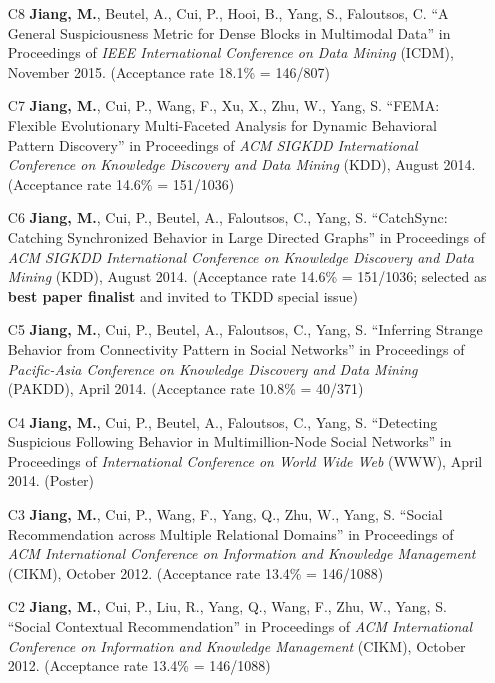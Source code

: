 \documentclass[10pt]{article}
\newenvironment{myindentpar}[1]%
{\begin{list}{}%
         {\setlength{\leftmargin}{#1}}%
         \item[]%
}
{\end{list}}
\newcounter{list}
\begin{document}
\begin{myindentpar}{0.00cm}
\begin{enumerate}[leftmargin=.5cm]
\item[C8] \textbf{Jiang, M.}, Beutel, A., Cui, P., Hooi, B., Yang, S., Faloutsos, C. ``A General Suspiciousness Metric for Dense Blocks in Multimodal Data'' in Proceedings of \textit{IEEE International Conference on Data Mining} (ICDM), November 2015. (Acceptance rate 18.1\% = 146/807)

\item[C7] \textbf{Jiang, M.}, Cui, P., Wang, F., Xu, X., Zhu, W., Yang, S. ``FEMA: Flexible Evolutionary Multi-Faceted Analysis for Dynamic Behavioral Pattern Discovery'' in Proceedings of \textit{ACM SIGKDD International Conference on Knowledge Discovery and Data Mining} (KDD), August 2014. (Acceptance rate 14.6\% = 151/1036)

\item[C6] \textbf{Jiang, M.}, Cui, P., Beutel, A., Faloutsos, C., Yang, S. ``CatchSync: Catching Synchronized Behavior in Large Directed Graphs'' in Proceedings of \textit{ACM SIGKDD International Conference on Knowledge Discovery and Data Mining} (KDD), August 2014. (Acceptance rate 14.6\% = 151/1036; selected as \textbf{best paper finalist} and invited to TKDD special issue)
	
\item[C5] \textbf{Jiang, M.}, Cui, P., Beutel, A., Faloutsos, C., Yang, S. ``Inferring Strange Behavior from Connectivity Pattern in Social Networks'' in Proceedings of \textit{Pacific-Asia Conference on Knowledge Discovery and Data Mining} (PAKDD), April 2014. (Acceptance rate 10.8\% = 40/371)

\item[C4] \textbf{Jiang, M.}, Cui, P., Beutel, A., Faloutsos, C., Yang, S. ``Detecting Suspicious Following Behavior in Multimillion-Node Social Networks'' in Proceedings of \textit{International Conference on World Wide Web} (WWW), April 2014. (Poster)

\item[C3] \textbf{Jiang, M.}, Cui, P., Wang, F., Yang, Q., Zhu, W., Yang, S. ``Social Recommendation across Multiple Relational Domains'' in Proceedings of \textit{ACM International Conference on Information and Knowledge Management} (CIKM), October 2012. (Acceptance rate 13.4\% = 146/1088)

\item[C2] \textbf{Jiang, M.}, Cui, P., Liu, R., Yang, Q., Wang, F., Zhu, W., Yang, S. ``Social Contextual Recommendation'' in Proceedings of \textit{ACM International Conference on Information and Knowledge Management} (CIKM), October 2012. (Acceptance rate 13.4\% = 146/1088)


\end{enumerate}
\end{myindentpar}
\end{document}
